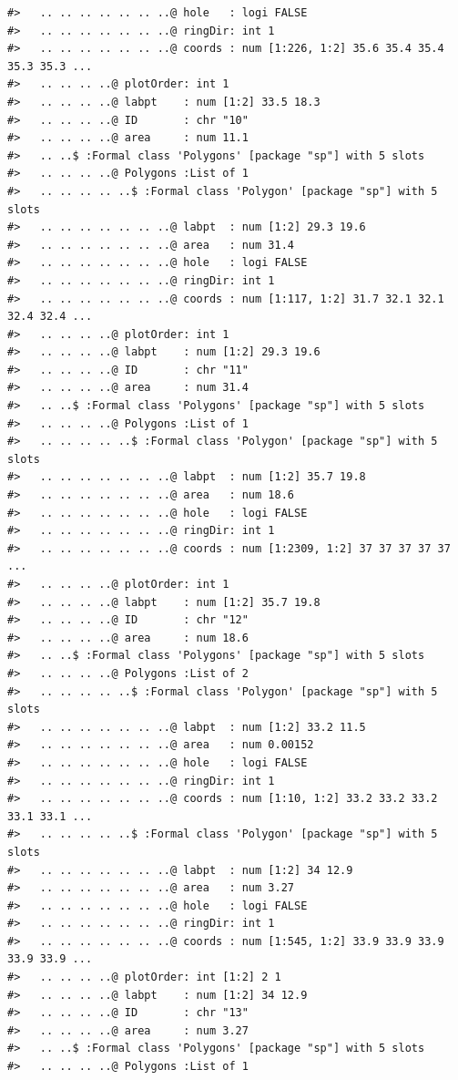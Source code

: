 \documentclass[12pt,a4paper,a4paper]{book}
\theoremstyle{definition}
\theoremstyle{definition}
\theoremstyle{definition}
\theoremstyle{remark}
\begin{document}
\begin{verbatim}
#>   .. .. .. .. .. .. ..@ hole   : logi FALSE
#>   .. .. .. .. .. .. ..@ ringDir: int 1
#>   .. .. .. .. .. .. ..@ coords : num [1:226, 1:2] 35.6 35.4 35.4 35.3 35.3 ...
#>   .. .. .. ..@ plotOrder: int 1
#>   .. .. .. ..@ labpt    : num [1:2] 33.5 18.3
#>   .. .. .. ..@ ID       : chr "10"
#>   .. .. .. ..@ area     : num 11.1
#>   .. ..$ :Formal class 'Polygons' [package "sp"] with 5 slots
#>   .. .. .. ..@ Polygons :List of 1
#>   .. .. .. .. ..$ :Formal class 'Polygon' [package "sp"] with 5 slots
#>   .. .. .. .. .. .. ..@ labpt  : num [1:2] 29.3 19.6
#>   .. .. .. .. .. .. ..@ area   : num 31.4
#>   .. .. .. .. .. .. ..@ hole   : logi FALSE
#>   .. .. .. .. .. .. ..@ ringDir: int 1
#>   .. .. .. .. .. .. ..@ coords : num [1:117, 1:2] 31.7 32.1 32.1 32.4 32.4 ...
#>   .. .. .. ..@ plotOrder: int 1
#>   .. .. .. ..@ labpt    : num [1:2] 29.3 19.6
#>   .. .. .. ..@ ID       : chr "11"
#>   .. .. .. ..@ area     : num 31.4
#>   .. ..$ :Formal class 'Polygons' [package "sp"] with 5 slots
#>   .. .. .. ..@ Polygons :List of 1
#>   .. .. .. .. ..$ :Formal class 'Polygon' [package "sp"] with 5 slots
#>   .. .. .. .. .. .. ..@ labpt  : num [1:2] 35.7 19.8
#>   .. .. .. .. .. .. ..@ area   : num 18.6
#>   .. .. .. .. .. .. ..@ hole   : logi FALSE
#>   .. .. .. .. .. .. ..@ ringDir: int 1
#>   .. .. .. .. .. .. ..@ coords : num [1:2309, 1:2] 37 37 37 37 37 ...
#>   .. .. .. ..@ plotOrder: int 1
#>   .. .. .. ..@ labpt    : num [1:2] 35.7 19.8
#>   .. .. .. ..@ ID       : chr "12"
#>   .. .. .. ..@ area     : num 18.6
#>   .. ..$ :Formal class 'Polygons' [package "sp"] with 5 slots
#>   .. .. .. ..@ Polygons :List of 2
#>   .. .. .. .. ..$ :Formal class 'Polygon' [package "sp"] with 5 slots
#>   .. .. .. .. .. .. ..@ labpt  : num [1:2] 33.2 11.5
#>   .. .. .. .. .. .. ..@ area   : num 0.00152
#>   .. .. .. .. .. .. ..@ hole   : logi FALSE
#>   .. .. .. .. .. .. ..@ ringDir: int 1
#>   .. .. .. .. .. .. ..@ coords : num [1:10, 1:2] 33.2 33.2 33.2 33.1 33.1 ...
#>   .. .. .. .. ..$ :Formal class 'Polygon' [package "sp"] with 5 slots
#>   .. .. .. .. .. .. ..@ labpt  : num [1:2] 34 12.9
#>   .. .. .. .. .. .. ..@ area   : num 3.27
#>   .. .. .. .. .. .. ..@ hole   : logi FALSE
#>   .. .. .. .. .. .. ..@ ringDir: int 1
#>   .. .. .. .. .. .. ..@ coords : num [1:545, 1:2] 33.9 33.9 33.9 33.9 33.9 ...
#>   .. .. .. ..@ plotOrder: int [1:2] 2 1
#>   .. .. .. ..@ labpt    : num [1:2] 34 12.9
#>   .. .. .. ..@ ID       : chr "13"
#>   .. .. .. ..@ area     : num 3.27
#>   .. ..$ :Formal class 'Polygons' [package "sp"] with 5 slots
#>   .. .. .. ..@ Polygons :List of 1

\end{verbatim}
\end{document}
